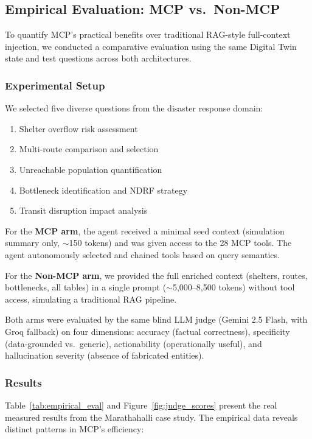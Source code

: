 \documentclass[journal]{IEEEtran}
\begin{document}
\subsection{Empirical Evaluation: MCP vs.\ Non-MCP}
\label{subsec:empirical_eval}

To quantify MCP's practical benefits over traditional RAG-style full-context
injection, we conducted a comparative evaluation using the same Digital Twin
state and test questions across both architectures.

\subsubsection{Experimental Setup}
We selected five diverse questions from the disaster response domain:
\begin{enumerate}[leftmargin=*]
    \item Shelter overflow risk assessment
    \item Multi-route comparison and selection
    \item Unreachable population quantification
    \item Bottleneck identification and NDRF strategy
    \item Transit disruption impact analysis
\end{enumerate}

For the \textbf{MCP arm}, the agent received a minimal seed context (simulation
summary only, $\sim$150 tokens) and was given access to the 28 MCP tools.
The agent autonomously selected and chained tools based on query semantics.

For the \textbf{Non-MCP arm}, we provided the full enriched context
(shelters, routes, bottlenecks, all tables) in a single prompt ($\sim$5,000--8,500 tokens)
without tool access, simulating a traditional RAG pipeline.

Both arms were evaluated by the same blind LLM judge (Gemini 2.5 Flash,
with Groq fallback) on four dimensions: accuracy (factual correctness),
specificity (data-grounded vs.\ generic), actionability (operationally useful),
and hallucination severity (absence of fabricated entities).

\subsubsection{Results}

Table~\ref{tab:empirical_eval} and Figure~\ref{fig:judge_scores} present the
real measured results from the Marathahalli case study. The empirical data reveals
distinct patterns in MCP's efficiency:
\end{document}
